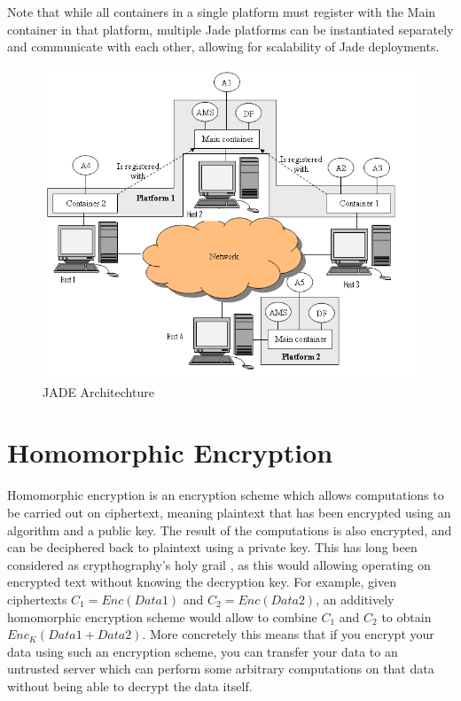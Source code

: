  Note that while all containers in a single platform must register with the Main container in that platform, multiple Jade platforms can be instantiated separately and communicate with each other, allowing for scalability of Jade deployments.
 
 \begin{figure}[h!]
 	\centering
	 	\includegraphics[width=\textwidth]{fig/jadeArchitecture}
	 	\caption{JADE Architechture}
	 	\label{fig:JADEarchitechture}
 \end{figure}



\section{Homomorphic Encryption}\label{sec:homomorphic_encryption}
Homomorphic encryption is an encryption scheme which allows computations to be carried out on ciphertext, meaning plaintext that has been encrypted using an algorithm and a public key. The result of the computations is also encrypted, and can be deciphered back to plaintext using a private key. This has long been considered as crypthography's holy grail \cite{Micciancio2011HomoEnc}, as this would allowing operating on encrypted text without knowing the decryption key. For example, given ciphertexts $C_1=Enc(Data1)$ and $C_2=Enc(Data2)$, an additively homomorphic encryption scheme would allow to combine $C_1$ and $C_2$ to obtain $Enc_K(Data1+Data2)$. More concretely this means that if you encrypt your data using such an encryption scheme, you can transfer your data to an untrusted server which can perform some arbitrary computations on that data without being able to decrypt the data itself.


